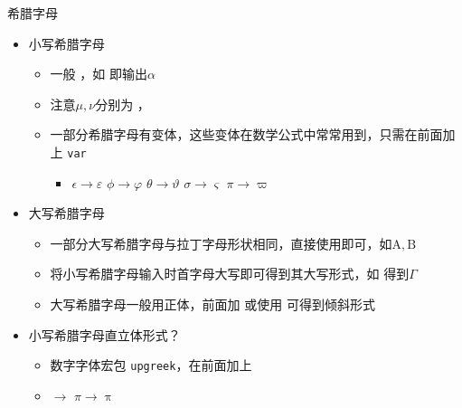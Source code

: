 \begin{frame}[fragile]{希腊字母}
	\begin{itemize}
		\item 小写希腊字母
		\begin{itemize}
			\item 一般 \cprotect{}，如 \cprotect\fbox{\verb|\alpha|} 即输出$\alpha$
			\item 注意$\mu, \nu$分别为 \cprotect\fbox{\verb|\mu|}，\cprotect\fbox{\verb|\nu|}
			\item 一部分希腊字母有变体，这些变体在数学公式中常常用到，只需在前面加上 \verb|var|
				\begin{itemize}
				\item[] \small $\epsilon \rightarrow \varepsilon$ \qquad $\phi \rightarrow \varphi$ \qquad
					$\theta \rightarrow \vartheta$ \qquad $\sigma \rightarrow \varsigma$ \qquad
					$\pi \rightarrow \varpi$
				\end{itemize}
		\end{itemize}
		\item 大写希腊字母
		\begin{itemize}
			\item 一部分大写希腊字母与拉丁字母形状相同，直接使用即可，如$\mathrm{A, B}$
			\item 将小写希腊字母输入时首字母大写即可得到其大写形式，如 \cprotect\fbox{\verb|\Gamma|} 得到$\Gamma$
			\item 大写希腊字母一般用正体，前面加 \cprotect{} 或使用 \cprotect\fbox{\verb|\mathnormal|} 可得到倾斜形式
		\end{itemize}
		\item 小写希腊字母直立体形式？
		\begin{itemize}
			\item 数字字体宏包 \verb|upgreek|，在前面加上 \cprotect{}
			\item \cprotect\fbox{\verb|\pi|} $\rightarrow$ \cprotect\fbox{\verb|\uppi|} \qquad $\pi \rightarrow \uppi$
		\end{itemize}
	\end{itemize}
\end{frame}
